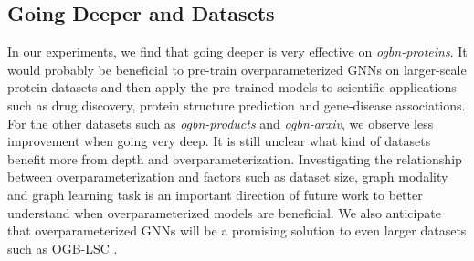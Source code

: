 \documentclass{article}
\begin{document}
\subsection{Going Deeper and Datasets}
In our experiments, we find that going deeper is very effective on \emph{ogbn-proteins}. It would probably be beneficial to pre-train overparameterized GNNs on larger-scale protein datasets and then apply the pre-trained models to scientific applications such as drug discovery, protein structure prediction and gene-disease associations. For the other datasets such as \emph{ogbn-products} and \emph{ogbn-arxiv}, we observe less improvement when going very deep. It is still unclear what kind of datasets benefit more from depth and overparameterization. Investigating the relationship between overparameterization and factors such as dataset size, graph modality and graph learning task is an important direction of future work to better understand when overparameterized models are beneficial. We also anticipate that overparameterized GNNs will be a promising solution to even larger datasets such as OGB-LSC \citep{hu2021ogblsc}.
\end{document}

